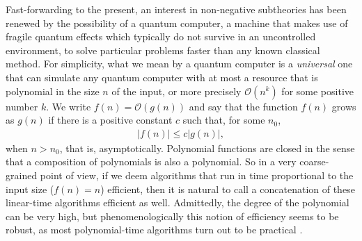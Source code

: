 Fast-forwarding to the present, an interest in non-negative subtheories has been renewed by the possibility of a quantum computer, a machine that makes use of fragile quantum effects which typically do not survive in an uncontrolled en\-vi\-ron\-ment, to solve particular problems faster than any known classical method. For simplicity, what we mean by a quantum computer is a \emph{universal} one that can simulate any quantum computer with at most a resource that is polynomial in the size $n$ of the input, or more precisely $\mathcal{O}(n^k)$ for some positive number $k$. We write $f(n)=\mathcal{O}(g(n))$ and say that the function $f(n)$ grows as $g(n)$ if there is a positive constant $c$ such that, for some $n_0$,
\begin{align}
	|f(n)| \le c|g(n)|,
\end{align}
when $n>n_0$, that is, asymptotically. Polynomial functions are closed in the sense that a composition of polynomials is also a polynomial. So in a very coarse-grained point of view, if we deem algorithms that run in time proportional to the input size ($f(n) = n$) efficient, then it is natural to call a concatenation of these linear-time algorithms efficient as well. Admittedly, the degree of the polynomial can be very high, but phenomenologically this notion of efficiency seems to be robust, as most polynomial-time algorithms turn out to be practical \cite{AB,aaronson2013democritus}.

